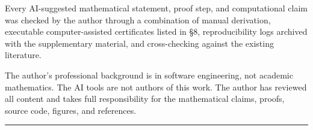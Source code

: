 \documentclass[
]{article}
\begin{document}
Every AI-suggested mathematical statement, proof step, and computational
claim was checked by the author through a combination of manual
derivation, executable computer-assisted certificates listed in §8,
reproducibility logs archived with the supplementary material, and
cross-checking against the existing literature.

The author's professional background is in software engineering, not
academic mathematics. The AI tools are not authors of this work. The
author has reviewed all content and takes full responsibility for the
mathematical claims, proofs, source code, figures, and references.

\begin{center}\rule{0.5\linewidth}{0.5pt}\end{center}



\end{document}
